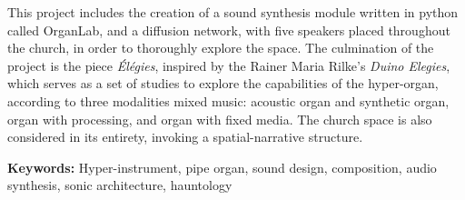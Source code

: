 \documentclass[12pt,twoside,maitrise]{dms_ks}
\newlength{\oldparskip}
\let\oldtableofcontents\tableofcontents  %
\renewcommand{\tableofcontents}{  %
    \begingroup
    \setlength{\parskip}{0pt}  %
    \oldtableofcontents  %
    \endgroup
    \setlength{\parskip}{\oldparskip}  %
}
\theoremstyle{definition}
\begin{document}
This project includes the creation of a sound synthesis module written in python called OrganLab, and a diffusion network, with five speakers placed throughout the church, in order to thoroughly explore the space. 
The culmination of the project is the piece \textit{Élégies}, inspired by the Rainer Maria Rilke's \textit{Duino Elegies}, which serves as a set of studies to explore the capabilities of the hyper-organ, according to three modalities mixed music: acoustic organ and synthetic organ, organ with processing, and organ with fixed media. 
The church space is also considered in its entirety, invoking a spatial-narrative structure. 

\textbf{Keywords:} Hyper-instrument, pipe organ, sound design, composition, audio synthesis, sonic architecture, hauntology



\anglais
\cleardoublepage
{}  %
\anglais
\tableofcontents
\cleardoublepage
\anglais
\english
{}  %
\cleardoublepage
{}
\end{document}
